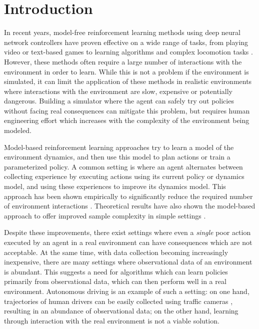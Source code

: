 \documentclass{article} %
\begin{document}
\section{Introduction}

In recent years, model-free reinforcement learning methods using deep neural network controllers have proven effective on a wide range of tasks, from playing video or text-based games \citep{mnih15, A3C, NarasimhanKB15} to learning algorithms \citep{Zaremba15} and complex locomotion tasks \citep{Lillicrap2015, ZhangLMUC15}.
However, these methods often require a large number of interactions with the environment in order to learn.
While this is not a problem if the environment is simulated, it can limit the application of these methods in realistic environments where interactions with the environment are slow, expensive or potentially dangerous.
Building a simulator where the agent can safely try out policies without facing real consequences can mitigate this problem, but requires human engineering effort which increases with the complexity of the environment being modeled.


Model-based reinforcement learning approaches try to learn a model of the environment dynamics, and then use this model to plan actions or train a parameterized policy.
A common setting is where an agent alternates between collecting experience by executing actions using its current policy or dynamics model, and using these experiences to improve its dynamics model.
This approach has been shown empirically to significantly reduce the required number of environment interactions \citep{Atkeson1997, PILCO, Nagabandi2017, Chua2018}.
Theoretical results have also shown the model-based approach to offer improved sample complexity in simple settings \citep{LS-LQR, Recht2018}.

Despite these improvements, there exist settings where even a \textit{single} poor action executed by an agent in a real environment can have consequences which are not acceptable.
At the same time, with data collection becoming increasingly inexpensive, there are many settings where observational data of an environment is abundant.
This suggests a need for algorithms which can learn policies primarily from observational data, which can then perform well in a real environment.
Autonomous driving is an example of such a setting: on one hand, trajectories of human drivers can be easily collected using traffic cameras \citep{NGSIM}, resulting in an abundance of observational data; on the other hand, learning through interaction with the real environment is not a viable solution.
\end{document}
